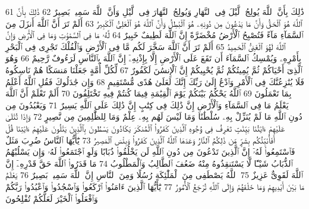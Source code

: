{\tiny\colorbox{cl_aya}{61}} ذَٰلِكَ بِأَنَّ ٱللَّهَ يُولِجُ ٱلَّيْلَ فِى ٱلنَّهَارِ وَيُولِجُ ٱلنَّهَارَ فِى ٱلَّيْلِ وَأَنَّ ٱللَّهَ سَمِيعٌۢ بَصِيرٌ
{\tiny\colorbox{cl_aya}{62}} ذَٰلِكَ بِأَنَّ ٱللَّهَ هُوَ ٱلْحَقُّ وَأَنَّ مَا يَدْعُونَ مِن دُونِهِۦ هُوَ ٱلْبَٰطِلُ وَأَنَّ ٱللَّهَ هُوَ ٱلْعَلِىُّ ٱلْكَبِيرُ
{\tiny\colorbox{cl_aya}{63}} أَلَمْ تَرَ أَنَّ ٱللَّهَ أَنزَلَ مِنَ ٱلسَّمَآءِ مَآءً فَتُصْبِحُ ٱلْأَرْضُ مُخْضَرَّةً إِنَّ ٱللَّهَ لَطِيفٌ خَبِيرٌ
{\tiny\colorbox{cl_aya}{64}} لَّهُۥ مَا فِى ٱلسَّمَٰوَٰتِ وَمَا فِى ٱلْأَرْضِ وَإِنَّ ٱللَّهَ لَهُوَ ٱلْغَنِىُّ ٱلْحَمِيدُ
{\tiny\colorbox{cl_aya}{65}} أَلَمْ تَرَ أَنَّ ٱللَّهَ سَخَّرَ لَكُم مَّا فِى ٱلْأَرْضِ وَٱلْفُلْكَ تَجْرِى فِى ٱلْبَحْرِ بِأَمْرِهِۦ وَيُمْسِكُ ٱلسَّمَآءَ أَن تَقَعَ عَلَى ٱلْأَرْضِ إِلَّا بِإِذْنِهِۦٓ إِنَّ ٱللَّهَ بِٱلنَّاسِ لَرَءُوفٌ رَّحِيمٌ
{\tiny\colorbox{cl_aya}{66}} وَهُوَ ٱلَّذِىٓ أَحْيَاكُمْ ثُمَّ يُمِيتُكُمْ ثُمَّ يُحْيِيكُمْ إِنَّ ٱلْإِنسَٰنَ لَكَفُورٌ
{\tiny\colorbox{cl_aya}{67}} لِّكُلِّ أُمَّةٍ جَعَلْنَا مَنسَكًا هُمْ نَاسِكُوهُ فَلَا يُنَٰزِعُنَّكَ فِى ٱلْأَمْرِ وَٱدْعُ إِلَىٰ رَبِّكَ إِنَّكَ لَعَلَىٰ هُدًى مُّسْتَقِيمٍ
{\tiny\colorbox{cl_aya}{68}} وَإِن جَٰدَلُوكَ فَقُلِ ٱللَّهُ أَعْلَمُ بِمَا تَعْمَلُونَ
{\tiny\colorbox{cl_aya}{69}} ٱللَّهُ يَحْكُمُ بَيْنَكُمْ يَوْمَ ٱلْقِيَٰمَةِ فِيمَا كُنتُمْ فِيهِ تَخْتَلِفُونَ
{\tiny\colorbox{cl_aya}{70}} أَلَمْ تَعْلَمْ أَنَّ ٱللَّهَ يَعْلَمُ مَا فِى ٱلسَّمَآءِ وَٱلْأَرْضِ إِنَّ ذَٰلِكَ فِى كِتَٰبٍ إِنَّ ذَٰلِكَ عَلَى ٱللَّهِ يَسِيرٌ
{\tiny\colorbox{cl_aya}{71}} وَيَعْبُدُونَ مِن دُونِ ٱللَّهِ مَا لَمْ يُنَزِّلْ بِهِۦ سُلْطَٰنًا وَمَا لَيْسَ لَهُم بِهِۦ عِلْمٌ وَمَا لِلظَّٰلِمِينَ مِن نَّصِيرٍ
{\tiny\colorbox{cl_aya}{72}} وَإِذَا تُتْلَىٰ عَلَيْهِمْ ءَايَٰتُنَا بَيِّنَٰتٍ تَعْرِفُ فِى وُجُوهِ ٱلَّذِينَ كَفَرُوا۟ ٱلْمُنكَرَ يَكَادُونَ يَسْطُونَ بِٱلَّذِينَ يَتْلُونَ عَلَيْهِمْ ءَايَٰتِنَا قُلْ أَفَأُنَبِّئُكُم بِشَرٍّ مِّن ذَٰلِكُمُ ٱلنَّارُ وَعَدَهَا ٱللَّهُ ٱلَّذِينَ كَفَرُوا۟ وَبِئْسَ ٱلْمَصِيرُ
{\tiny\colorbox{cl_aya}{73}} يَٰٓأَيُّهَا ٱلنَّاسُ ضُرِبَ مَثَلٌ فَٱسْتَمِعُوا۟ لَهُۥٓ إِنَّ ٱلَّذِينَ تَدْعُونَ مِن دُونِ ٱللَّهِ لَن يَخْلُقُوا۟ ذُبَابًا وَلَوِ ٱجْتَمَعُوا۟ لَهُۥ وَإِن يَسْلُبْهُمُ ٱلذُّبَابُ شَيْـًٔا لَّا يَسْتَنقِذُوهُ مِنْهُ ضَعُفَ ٱلطَّالِبُ وَٱلْمَطْلُوبُ
{\tiny\colorbox{cl_aya}{74}} مَا قَدَرُوا۟ ٱللَّهَ حَقَّ قَدْرِهِۦٓ إِنَّ ٱللَّهَ لَقَوِىٌّ عَزِيزٌ
{\tiny\colorbox{cl_aya}{75}} ٱللَّهُ يَصْطَفِى مِنَ ٱلْمَلَٰٓئِكَةِ رُسُلًا وَمِنَ ٱلنَّاسِ إِنَّ ٱللَّهَ سَمِيعٌۢ بَصِيرٌ
{\tiny\colorbox{cl_aya}{76}} يَعْلَمُ مَا بَيْنَ أَيْدِيهِمْ وَمَا خَلْفَهُمْ وَإِلَى ٱللَّهِ تُرْجَعُ ٱلْأُمُورُ
{\tiny\colorbox{cl_aya}{77}} يَٰٓأَيُّهَا ٱلَّذِينَ ءَامَنُوا۟ ٱرْكَعُوا۟ وَٱسْجُدُوا۟ وَٱعْبُدُوا۟ رَبَّكُمْ وَٱفْعَلُوا۟ ٱلْخَيْرَ لَعَلَّكُمْ تُفْلِحُونَ
